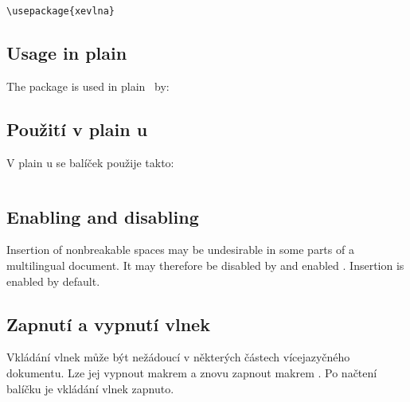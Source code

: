 \fi

\medskip
\begin{verbatim}
\usepackage{xevlna}
\end{verbatim}


\ifeng

\subsection{Usage in plain \texorpdfstring{\XeTeX}{XeTeX}}
The package is used in plain \XeTeX\ by:

\else

\subsection{Použití v plain \texorpdfstring{\XeTeX u}{XeTeXu}}
V plain \XeTeX u se balíček použije takto:

\fi

\medskip
\begin{verbatim}

\end{verbatim}


\ifeng

\subsection{Enabling and disabling}
Insertion of nonbreakable spaces may be undesirable in some parts of a multilingual document. It
may therefore be disabled by  and enabled . Insertion is
enabled by default.

\else

\subsection{Zapnutí a vypnutí vlnek}
Vkládání vlnek může být nežádoucí v některých částech vícejazyčného dokumentu. Lze jej vypnout
makrem  a znovu zapnout makrem . Po načtení balíčku je
vkládání vlnek zapnuto.

\fi


\ifeng


